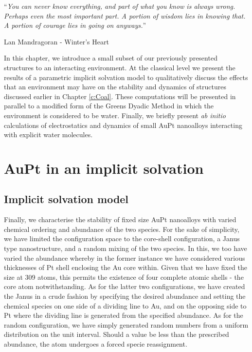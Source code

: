 \noindent\enquote{\itshape You can never know everything, and part of what you know is always wrong. Perhaps even the most important part. A portion of wisdom lies in knowing that. A portion of courage lies in going on anyways.}\bigbreak

\hfill Lan Mandragoran - Winter's Heart

\vspace*{0.05\textheight}

In this chapter, we introduce a small subset of our previously presented structures to an interacting environment. At the classical level we present the results of a parametric implicit solvation model to qualitatively discuss the effects that an environment may have on the stability and dynamics of structures discussed earlier in Chapter \ref{c:Coal}. These computations will be presented in parallel to a modified form of the Greens Dyadic Method in which the environment is considered to be water. Finally, we briefly present \textit{ab initio} calculations of electrostatics and dynamics of small AuPt nanoalloys interacting with explicit water molecules.

\section{AuPt in an implicit solvation}
\label{Class_Water}

\subsection{Implicit solvation model}

Finally, we characterise the stability of fixed size AuPt nanoalloys with varied chemical ordering and abundance of the two species. For the sake of simplicity, we have limited the configuration space to the core-shell configuration, a Janus type nanostructure, and a random mixing of the two species. In this, we too have varied the abundance whereby in the former instance we have considered various thicknesses of Pt shell enclosing the Au core within. Given that we have fixed the size at 309 atoms, this permits the existence of four complete atomic shells - the core atom notwithstanding. As for the latter two configurations, we have created the Janus in a crude fashion by specifying the desired abundance and setting the chemical species on one side of a dividing line to Au, and on the opposing side to Pt where the dividing line is generated from the specified abundance. As for the random configuration, we have simply generated random numbers from a uniform distribution on the unit interval. Should a value be less than the prescribed abundance, the atom undergoes a forced specie reassignment.

